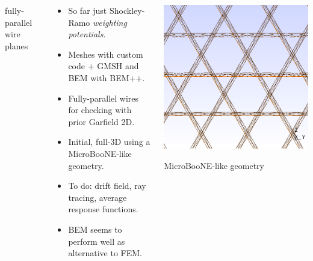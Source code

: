 \documentclass[xcolor=dvipsnames]{beamer}
\begin{document}
\begin{frame}
\begin{columns}
\begin{column}{0.15\textwidth}
      \tiny fully-parallel wire planes
    \end{column}
    \begin{column}{0.7\textwidth}
      \begin{itemize}\scriptsize
      \item So far just Shockley-Ramo \textit{weighting potentials}.
      \item Meshes with custom code + GMSH and BEM with BEM++.
      \item Fully-parallel wires for checking with prior Garfield 2D.
      \item Initial, full-3D using a MicroBooNE-like geometry.
      \item To do: drift field, ray tracing, average response functions.
      \item BEM seems to perform well as alternative to FEM.
      \end{itemize}
    \end{column}
    \begin{column}{0.15\textwidth}
      \includegraphics[width=\textwidth]{uboone-mesh.png}

      \tiny MicroBooNE-like geometry
    \end{column}
  \end{columns}


\end{frame}
\end{document}
